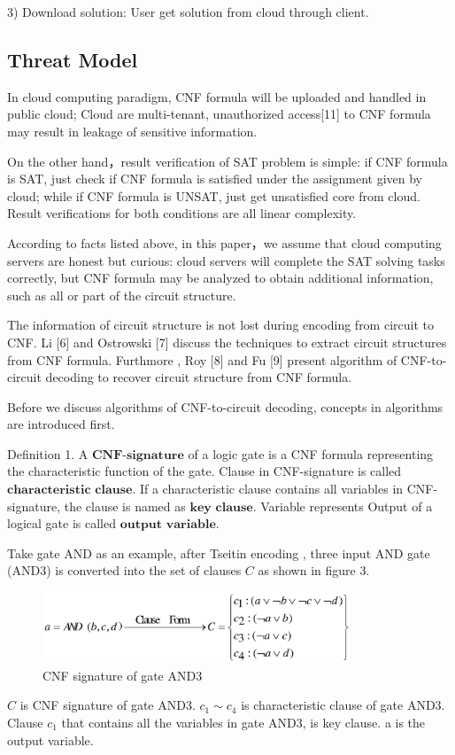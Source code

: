 \documentclass[runningheads,a4paper]{llncs}
\begin{document}
3)  Download solution: User get solution from cloud through client.{}
\subsection{Threat Model}

In cloud computing paradigm, CNF formula will be uploaded and handled in public cloud; 
Cloud are multi-tenant, unauthorized access[11] to CNF formula may result in leakage of sensitive information.

On the other hand，result verification of SAT problem is simple: if CNF formula is SAT, just check if CNF formula is satisfied under the assignment given by cloud;
while if CNF formula is UNSAT, just get unsatisfied core from cloud. Result verifications for both conditions are all linear complexity.

According to facts listed above, in this paper，we assume that cloud computing servers are honest but curious:
cloud servers will complete the SAT solving tasks correctly, but CNF formula may be analyzed to obtain additional information, such as all or part of the circuit structure.

The information of circuit structure is not lost during encoding from circuit to CNF. Li [6] and Ostrowski [7] discuss the techniques to extract circuit structures from CNF formula.
Furthmore , Roy [8] and Fu [9]  present algorithm of CNF-to-circuit decoding to recover circuit structure from CNF formula.

Before we discuss algorithms of CNF-to-circuit decoding, concepts in algorithms are introduced first.  

\noindent \newline Definition 1. A $\mathbf{CNF}$-$\mathbf{signature}$ of a logic gate is a CNF formula representing the characteristic function of the gate.
Clause in CNF-signature is called $\mathbf{characteristic}$ $\mathbf{clause}$.
If a characteristic clause contains all variables in CNF-signature, the clause is named as $\mathbf{key}$ $\mathbf{clause}$.
Variable represents Output of a logical gate is called $\mathbf{output}$ $\mathbf{variable}$.
\setlength{\parindent}{2em} \newline

Take gate AND as an example, after Tseitin encoding , three input AND gate (AND3) is converted into the set of clauses $C$ as shown in figure 3.
\begin{figure}
\centering
\includegraphics[width=9.2cm]{a3}
\caption{CNF signature of gate AND3 }
\end{figure}
$C$ is CNF signature of gate AND3. $c_1 \sim c_4$ is characteristic clause of gate AND3. 
Clause $c_1$ that contains all the variables in gate AND3, is key clause. a is the output variable.
\end{document}
